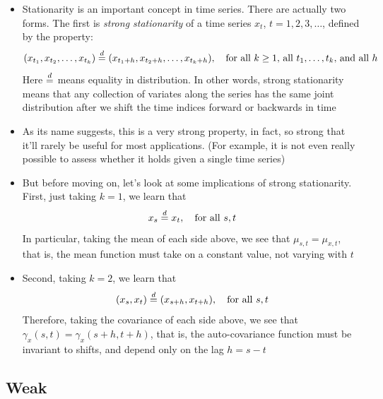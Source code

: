 \documentclass{article}
\begin{document}
\begin{itemize}
\item Stationarity is an important concept in time series. There are actually
  two forms. The first is \emph{strong stationarity} of a time series $x_t$,
  $t = 1,2,3,\dots$, defined by the property:
  \[
  (x_{t_1}, x_{t_2}, \dots, x_{t_k}) \overset{d}{=} (x_{t_1+h}, x_{t_2+h}, \dots,
  x_{t_k+h}), \quad \text{for all $k \geq 1$, all $t_1,\dots,t_k$, and all
    $h$}  
  \]
  Here $\overset{d}{=}$ means equality in distribution. In other words, strong
  stationarity means that any collection of variates along the series has the
  same joint distribution after we shift the time indices forward or backwards
  in time  

\item As its name suggests, this is a very strong property, in fact, so strong 
  that it'll rarely be useful for most applications. (For example, it is not
  even really possible to assess whether it holds given a single time series)  

\item But before moving on, let's look at some implications of strong 
  stationarity. First, just taking $k=1$, we learn that
  \[
  x_s \overset{d}{=} x_t, \quad \text{for all $s,t$}
  \]
  In particular, taking the mean of each side above, we see that $\mu_{s,t} =
  \mu_{x,t}$, that is, the mean function must take on a constant value, not
  varying with $t$

\item Second, taking $k=2$, we learn that 
  \[
  (x_s, x_t) \overset{d}{=} (x_{s+h}, x_{t+h}), \quad \text{for all $s,t$}
  \]
  Therefore, taking the covariance of each side above, we see that
  $\gamma_x(s,t) = \gamma_x(s+h, t+h)$, that is, the auto-covariance function 
  must be invariant to shifts, and depend only on the lag $h = s-t$ 
\end{itemize}

\subsection{Weak}
\end{document}
